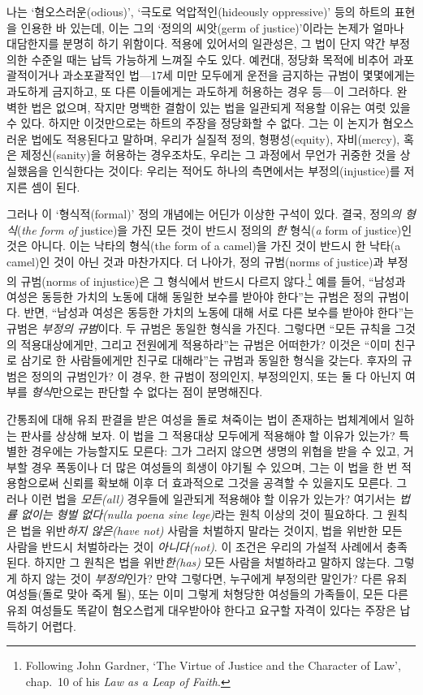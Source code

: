 \documentclass[12pt, oneside]{book}  %
\begin{document}
나는 `혐오스러운(odious)', `극도로 억압적인(hideously oppressive)' 등의
하트의 표현을 인용한 바 있는데, 이는 그의 `정의의 씨앗(germ of
justice)'이라는 논제가 얼마나 대담한지를 분명히 하기 위함이다. 적용에
있어서의 일관성은, 그 법이 단지 약간 부정의한 수준일 때는 납득 가능하게
느껴질 수도 있다. 예컨대, 정당화 목적에 비추어 과포괄적이거나
과소포괄적인 법---17세 미만 모두에게 운전을 금지하는 규범이 몇몇에게는
과도하게 금지하고, 또 다른 이들에게는 과도하게 허용하는 경우 등---이
그러하다. 완벽한 법은 없으며, 작지만 명백한 결함이 있는 법을 일관되게
적용할 이유는 여럿 있을 수 있다. 하지만 이것만으로는 하트의 주장을
정당화할 수 없다. 그는 이 논지가 혐오스러운 법에도 적용된다고 말하며,
우리가 실질적 정의, 형평성(equity), 자비(mercy), 혹은 제정신(sanity)을
허용하는 경우조차도, 우리는 그 과정에서 무언가 귀중한 것을 상실했음을
인식한다는 것이다: 우리는 적어도 하나의 측면에서는 부정의(injustice)를
저지른 셈이 된다.

그러나 이 `형식적(formal)' 정의 개념에는 어딘가 이상한 구석이 있다.
결국, 정의\emph{의 형식}(\emph{the form of} justice)을 가진 모든 것이
반드시 정의의 \emph{한} 형식(\emph{a} form of justice)인 것은 아니다.
이는 낙타의 형식(the form of a camel)을 가진 것이 반드시 한 낙타(a
camel)인 것이 아닌 것과 마찬가지다. 더 나아가, 정의 규범(norms of
justice)과 부정의 규범(norms of injustice)은 그 형식에서 반드시 다르지
않다.\footnote{Following John Gardner, `The Virtue of Justice and the
  Character of Law', chap.~10 of his \emph{Law as a Leap of Faith}.}
예를 들어, ``남성과 여성은 동등한 가치의 노동에 대해 동일한 보수를
받아야 한다''는 규범은 정의 규범이다. 반면, ``남성과 여성은 동등한
가치의 노동에 대해 서로 다른 보수를 받아야 한다''는 규범은 \emph{부정의
규범}이다. 두 규범은 동일한 형식을 가진다. 그렇다면 ``모든 규칙을 그것의
적용대상에게만, 그리고 전원에게 적용하라''는 규범은 어떠한가? 이것은
``이미 친구로 삼기로 한 사람들에게만 친구로 대해라''는 규범과 동일한
형식을 갖는다. 후자의 규범은 정의의 규범인가? 이 경우, 한 규범이
정의인지, 부정의인지, 또는 둘 다 아닌지 여부를 \emph{형식}만으로는
판단할 수 없다는 점이 분명해진다.

간통죄에 대해 유죄 판결을 받은 여성을 돌로 쳐죽이는 법이 존재하는
법체계에서 일하는 판사를 상상해 보자. 이 법을 그 적용대상 모두에게
적용해야 할 이유가 있는가? 특별한 경우에는 가능할지도 모른다: 그가
그러지 않으면 생명의 위협을 받을 수 있고, 거부할 경우 폭동이나 더 많은
여성들의 희생이 야기될 수 있으며, 그는 이 법을 한 번 적용함으로써 신뢰를
확보해 이후 더 효과적으로 그것을 공격할 수 있을지도 모른다. 그러나 이런
법을 \emph{모든(all)} 경우들에 일관되게 적용해야 할 이유가 있는가?
여기서는 \emph{법률 없이는 형벌 없다(nulla poena sine lege)}라는 원칙
이상의 것이 필요하다. 그 원칙은 법을 위반\emph{하지 않은(have not)}
사람을 처벌하지 말라는 것이지, 법을 위반한 모든 사람을 반드시 처벌하라는
것이 \emph{아니다(not)}. 이 조건은 우리의 가설적 사례에서 충족된다.
하지만 그 원칙은 법을 위반\emph{한(has)} 모든 사람을 처벌하라고 말하지
않는다. 그렇게 하지 않는 것이 \emph{부정의}인가? 만약 그렇다면, 누구에게
부정의란 말인가? 다른 유죄 여성들(돌로 맞아 죽게 될), 또는 이미 그렇게
처형당한 여성들의 가족들이, 모든 다른 유죄 여성들도 똑같이 혐오스럽게
대우받아야 한다고 요구할 자격이 있다는 주장은 납득하기 어렵다.
\end{document}
